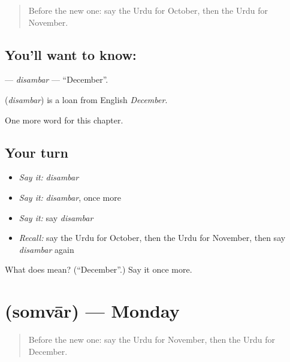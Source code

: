 \label{lesson:UR-C218-disambar}



\begin{quote}
Before the new one: say the Urdu for October, then the Urdu for November.
\end{quote}

\subsection*{You'll want to know: }
\textbf{} — \emph{disambar} — \textquotedblleft{}December\textquotedblright{}.

\begin{cousinweb}
\textbf{} (\emph{disambar}) is a loan from English \emph{December}.
\end{cousinweb}

\begin{grammarlens}[title={What you've built}]
One more word for this chapter.
\end{grammarlens}

\subsection*{Your turn}
\begin{itemize}
\raggedright
  \item \emph{Say it:} \emph{disambar}
  \item \emph{Say it:} \emph{disambar}, once more
  \item \emph{Say it:} say \emph{disambar}
  \item \emph{Recall:} say the Urdu for October, then the Urdu for November, then say \emph{disambar} again
\end{itemize}

\begin{tcolorbox}[breakable,colback=teal!4,colframe=teal!35!black,title={Before you move on}]
What does  mean? (\textquotedblleft{}December\textquotedblright{}.) Say it once more.
\end{tcolorbox}
\section[\texorpdfstring{\ur{سوموار} (somvār)}{سوموار (somvār)}]{ (somvār) — Monday}

\label{lesson:UR-C218-somvar}



\begin{quote}
Before the new one: say the Urdu for November, then the Urdu for December.
\end{quote}

